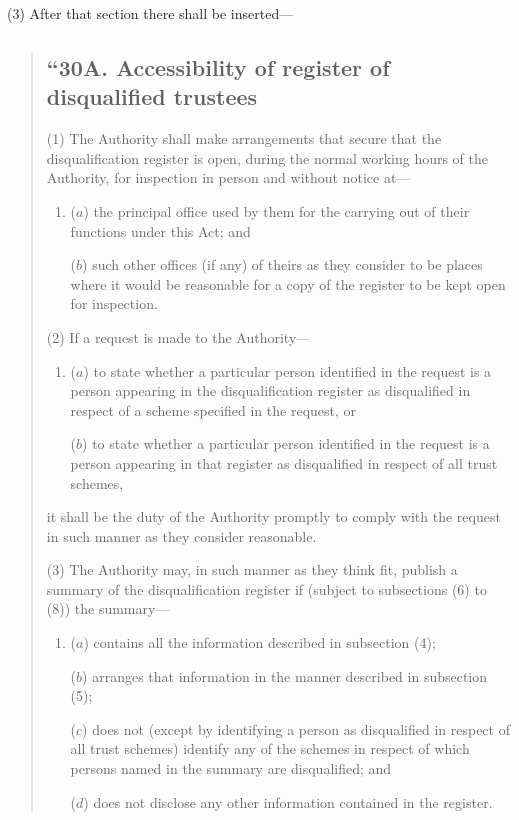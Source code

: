 \documentclass[12pt,a4paper]{article}
\begin{document}
(3) After that section there shall be inserted—
\begin{quotation}
\subsection*{“30A. Accessibility of register of disqualified trustees}

(1) The Authority shall make arrangements that secure that the disqualification register is open, during the normal working hours of the Authority, for inspection in person and without notice at—
\begin{enumerate}\item[]
($a$) the principal office used by them for the carrying out of their functions under this Act; and

($b$) such other offices (if any) of theirs as they consider to be places where it would be reasonable for a copy of the register to be kept open for inspection.
\end{enumerate}

(2) If a request is made to the Authority—
\begin{enumerate}\item[]
($a$) to state whether a particular person identified in the request is a person appearing in the disqualification register as disqualified in respect of a scheme specified in the request, or

($b$) to state whether a particular person identified in the request is a person appearing in that register as disqualified in respect of all trust schemes,
\end{enumerate}
it shall be the duty of the Authority promptly to comply with the request in such manner as they consider reasonable.

(3) The Authority may, in such manner as they think fit, publish a summary of the disqualification register if (subject to subsections (6)  to (8)) the summary—
\begin{enumerate}\item[]
($a$) contains all the information described in subsection (4);

($b$) arranges that information in the manner described in subsection (5);

($c$) does not (except by identifying a person as disqualified in respect of all trust schemes) identify any of the schemes in respect of which persons named in the summary are disqualified; and

($d$) does not disclose any other information contained in the register.
\end{enumerate}


\end{quotation}
\end{document}
